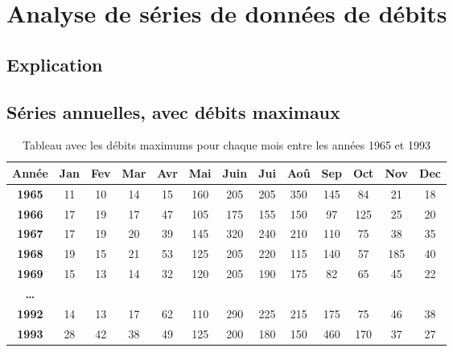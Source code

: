 \chapter{Analyse de séries de données de débits}

\section{Explication}

\section{Séries annuelles, avec débits maximaux}

\begin{table}[H]
    \centering
    \begin{tabular}{|c||c|c|c|c|c|c|c|c|c|c|c|c|}
        \hline
        \textbf{Année} & \textbf{Jan} & \textbf{Fev} & \textbf{Mar} & \textbf{Avr} & \textbf{Mai} & \textbf{Juin} & \textbf{Jui} & \textbf{Aoû} & \textbf{Sep} & \textbf{Oct} & \textbf{Nov} & \textbf{Dec} \\
        \hline \hline
        \textbf{1965}  & 11 & \cellcolor{green}10 & 14 & 15 & 160 & 205 & 205 & \cellcolor{red}350 & 145 &  84 &  21 & 18 \\
        \hline
        \textbf{1966}  & \cellcolor{green}17 & 19 & 17 & 47 & 105 & \cellcolor{red}175 & 155 & 150 &  97 & 125 &  25 & 20 \\
        \hline
        \textbf{1967}  & \cellcolor{green}17 & 19 & 20 & 39 & 145 & \cellcolor{red}320 & 240 & 210 & 110 &  75 &  38 & 35 \\
        \hline
        \textbf{1968}  & 19 & \cellcolor{green}15 & 21 & 53 & 125 & 205 & \cellcolor{red}220 & 115 & 140 &  57 & 185 & 40 \\
        \hline
        \textbf{1969}  & 15 & \cellcolor{green}13 & 14 & 32 & 120 & \cellcolor{red}205 & 190 & 175 &  82 &  65 &  45 & 22 \\
        \hline
        \textbf{\dots} &    &    &    &    &     &     &     &     &       &     &     &      \\
        \hline
        \textbf{1992}  & 14 & \cellcolor{green}13 & 17 & 62 & 110 & \cellcolor{red}290 & 225 & 215 & 175 &  75 &  46 & 38 \\
        \hline
        \textbf{1993}  & 28 & 42 & 38 & 49 & 125 & 200 & 180 & 150 & \cellcolor{red}460 & 170 &  37 & \cellcolor{green}27 \\
        \hline
    \end{tabular}
    \caption{Tableau avec les débits maximums pour chaque mois entre les années 1965 et 1993}
    \label{tab:serieAnnuelleMaximum}
\end{table}

